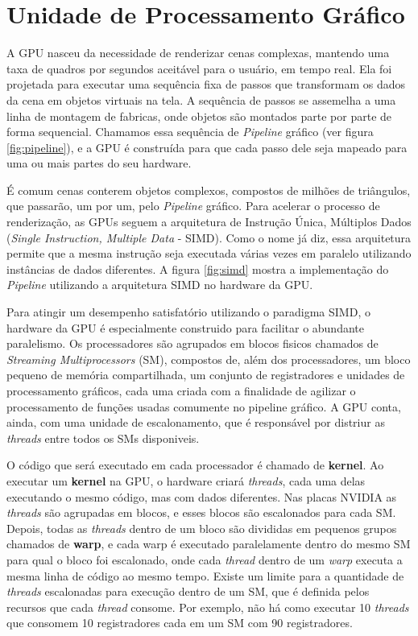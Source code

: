 \chapter{Unidade de Processamento Gráfico}\label{GPU}

    A GPU nasceu da necessidade de renderizar cenas complexas, mantendo uma taxa de quadros por segundos
aceitável para o usuário, em tempo real. Ela foi projetada para executar uma sequência fixa de passos que transformam
os dados da cena em objetos virtuais na tela. A sequência de passos se assemelha a uma linha de montagem de fabricas,
onde objetos são montados parte por parte de forma sequencial. Chamamos essa sequência de \textit{Pipeline} gráfico
(ver figura \ref{fig:pipeline}), e a GPU é construída para que cada passo dele seja mapeado para uma ou mais partes do
seu hardware.

    É comum cenas conterem objetos complexos, compostos de milhões de triângulos, que passarão, um por um, pelo
\textit{Pipeline} gráfico. Para acelerar o processo de renderização, as GPUs seguem a arquitetura de Instrução Única,
Múltiplos Dados (\textit{Single Instruction, Multiple Data} - SIMD). Como o nome já diz, essa arquitetura permite que
a mesma instrução seja executada várias vezes em paralelo utilizando instâncias de dados diferentes. A figura
\ref{fig:simd} mostra a implementação do \textit{Pipeline} utilizando a arquitetura SIMD no hardware da GPU.

  Para atingir um desempenho satisfatório utilizando o paradigma SIMD, o hardware
da GPU é especialmente construido para facilitar o abundante paralelismo. Os
processadores são agrupados em blocos fisicos chamados de \textit{Streaming Multiprocessors} (SM),
compostos de, além dos processadores, um bloco pequeno de memória compartilhada,
um conjunto de registradores e unidades de processamento gráficos, cada uma criada
com a finalidade de agilizar o processamento de funções usadas comumente no pipeline
gráfico. A GPU conta, ainda, com uma unidade de escalonamento, que é responsável
por distriur as \textit{threads} entre todos os SMs disponiveis.

    O código que será executado em cada processador é chamado de \textbf{kernel}. Ao executar um \textbf{kernel} na GPU, o
hardware criará \textit{threads}, cada uma delas executando o mesmo código, mas com dados diferentes. Nas placas NVIDIA as \textit{threads}
são agrupadas em blocos, e esses blocos são escalonados para cada SM. Depois, todas as \textit{threads} dentro de um bloco são
divididas em pequenos grupos chamados de \textbf{warp}, e cada warp é executado paralelamente dentro do
mesmo SM para qual o bloco foi escalonado, onde cada \textit{thread} dentro de um \textit{warp} executa a mesma linha de código ao mesmo tempo.
Existe um limite para a quantidade de \textit{threads} escalonadas para execução
dentro de um SM, que é definida pelos recursos que cada \textit{thread} consome. Por exemplo, não há como executar 10 \textit{threads}
que consomem 10 registradores cada em um SM com 90 registradores.

